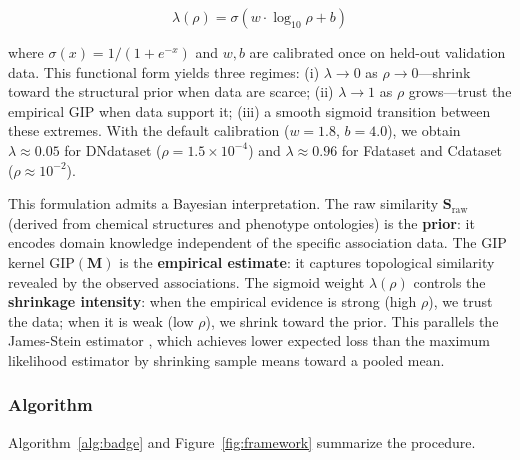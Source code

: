 \documentclass{oup-authoring-template}
\begin{document}
\begin{equation}
\lambda(\rho) = \sigma(w \cdot \log_{10} \rho + b)
\label{eq:lambda}
\end{equation}

where $\sigma(x) = 1/(1 + e^{-x})$ and $w, b$ are calibrated once on held-out validation data. This functional form yields three regimes: (i) $\lambda \to 0$ as $\rho \to 0$---shrink toward the structural prior when data are scarce; (ii) $\lambda \to 1$ as $\rho$ grows---trust the empirical GIP when data support it; (iii) a smooth sigmoid transition between these extremes. With the default calibration ($w=1.8$, $b=4.0$), we obtain $\lambda \approx 0.05$ for DNdataset ($\rho = 1.5 \times 10^{-4}$) and $\lambda \approx 0.96$ for Fdataset and Cdataset ($\rho \approx 10^{-2}$).

This formulation admits a Bayesian interpretation. The raw similarity $\mathbf{S}_{\text{raw}}$ (derived from chemical structures and phenotype ontologies) is the \textbf{prior}: it encodes domain knowledge independent of the specific association data. The GIP kernel $\text{GIP}(\mathbf{M})$ is the \textbf{empirical estimate}: it captures topological similarity revealed by the observed associations. The sigmoid weight $\lambda(\rho)$ controls the \textbf{shrinkage intensity}: when the empirical evidence is strong (high $\rho$), we trust the data; when it is weak (low $\rho$), we shrink toward the prior. This parallels the James-Stein estimator \cite{james1961,efron1975}, which achieves lower expected loss than the maximum likelihood estimator by shrinking sample means toward a pooled mean.

\subsubsection{Algorithm}

Algorithm~\ref{alg:badge} and Figure~\ref{fig:framework} summarize the procedure.
\end{document}
